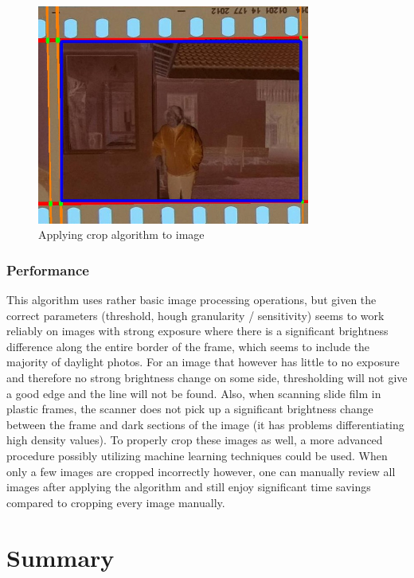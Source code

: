 \documentclass{article}
\begin{document}
\begin{figure}[H]
  \caption{Applying crop algorithm to image}
  \centering
  \includegraphics[width=0.8\textwidth]{images/crop_steps/step6.jpg}
\end{figure}

\subsubsection{Performance}

This algorithm uses rather basic image processing operations, but given
the correct parameters (threshold, hough granularity / sensitivity) seems to
work reliably on images with strong exposure where there is a significant brightness
difference along the entire border of the frame, which seems to include the
majority of daylight photos. For an image that however has little to no exposure
and therefore no strong brightness change on some side, thresholding will not give
a good edge and the line will not be found. Also, when scanning slide film in plastic
frames, the scanner does not pick up a significant brightness change between
the frame and dark sections of the image (it has problems differentiating high density
values). To properly crop these images as well, a more advanced procedure possibly
utilizing machine learning techniques could be used. When only a few images are
cropped incorrectly however, one can manually review all images after applying the
algorithm and still enjoy significant time savings compared to cropping every image manually.

\section{Summary}
\end{document}
